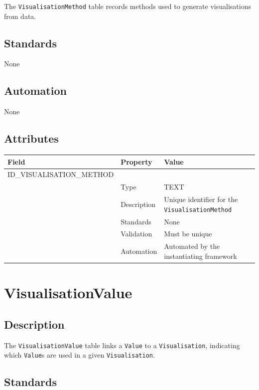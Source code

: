 \documentclass[
]{article}
\newcounter{none} %
\begin{document}
The \texttt{VisualisationMethod} table records methods used to generate
visualisations from data.

\subsection{Standards}\label{standards-42}

None

\subsection{Automation}\label{automation-42}

None

\subsection{Attributes}\label{attributes-36}

{\def\LTcaptype{none} %
\begin{longtable}[]{@{}lll@{}}
\toprule\noalign{}
Field & Property & Value \\
\midrule\noalign{}
\endhead
\bottomrule\noalign{}
\endlastfoot
ID\_VISUALISATION\_METHOD & & \\
& Type & TEXT \\
& Description & Unique identifier for the
\texttt{VisualisationMethod} \\
& Standards & None \\
& Validation & Must be unique \\
& Automation & Automated by the instantiating framework \\
\end{longtable}
}

\section{VisualisationValue}\label{visualisationvalue}

\subsection{Description}\label{description-41}

The \texttt{VisualisationValue} table links a \texttt{Value} to a
\texttt{Visualisation}, indicating which \texttt{Value}s are used in a
given \texttt{Visualisation}.

\subsection{Standards}\label{standards-43}
\end{document}
